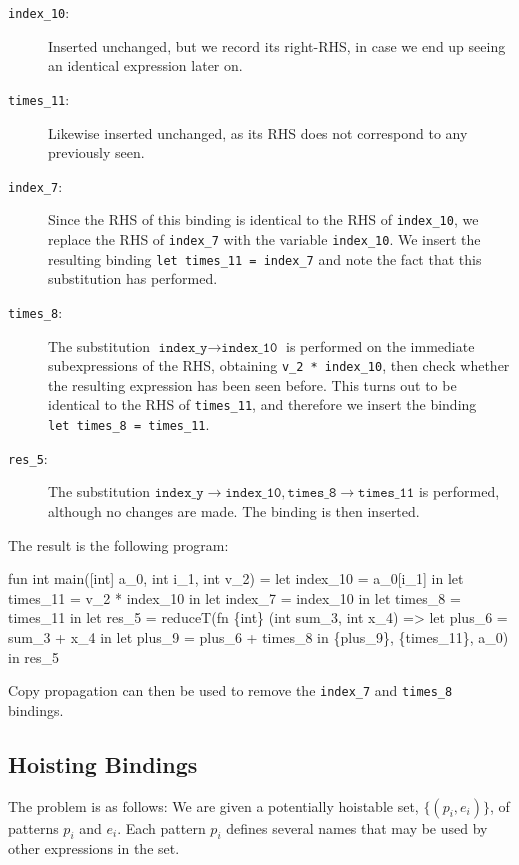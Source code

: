 \begin{description}
\item[\texttt{index\_10}:] Inserted unchanged, but we record its
  right-RHS, in case we end up seeing an identical expression
  later on.
\item[\texttt{times\_11}:] Likewise inserted unchanged, as its RHS
  does not correspond to any previously seen.
\item[\texttt{index\_7}:] Since the RHS of this binding is identical
  to the RHS of \texttt{index\_10}, we replace the RHS of
  \texttt{index\_7} with the variable \texttt{index\_10}.  We insert
  the resulting binding \texttt{let~times\_11~=~index\_7} and note the
  fact that this substitution has performed.
\item[\texttt{times\_8}:] The substitution
  $\texttt{index\_y}\rightarrow\texttt{index\_10}$ is performed on the
  immediate subexpressions of the RHS, obtaining
  \texttt{v\_2~*~index\_10}, then check whether the resulting
  expression has been seen before.  This turns out to be identical to
  the RHS of \texttt{times\_11}, and therefore we insert the binding
  \texttt{let~times\_8~=~times\_11}.
\item[\texttt{res\_5}:] The substitution
  $\texttt{index\_y}\rightarrow\texttt{index\_10},\texttt{times\_8}\rightarrow\texttt{times\_11}$
  is performed, although no changes are made.  The binding is then
  inserted.
\end{description}

The result is the following program:

\begin{colorcode}
fun int main([int] a_0, int i_1, int v_2) =
  let index_10 = a_0[i_1] in
  let times_11 = v_2 * index_10 in
  let index_7 = index_10 in
  let times_8 = times_11 in
  let {res_5} =
    reduceT(fn \{int\} (int sum_3, int x_4) =>
              let plus_6 = sum_3 + x_4 in
              let plus_9 = plus_6 + times_8 in
              \{plus_9\},
            \{times_11\}, a_0) in
  res_5
\end{colorcode}

Copy propagation can then be used to remove the \texttt{index\_7} and
\texttt{times\_8} bindings.

\subsection{Hoisting Bindings}

The problem is as follows: We are given a potentially hoistable set,
$\{(p_{i}, e_{i})\}$, of patterns $p_{i}$ and $e_{i}$.  Each pattern
$p_{i}$ defines several names that may be used by other expressions in
the set.

